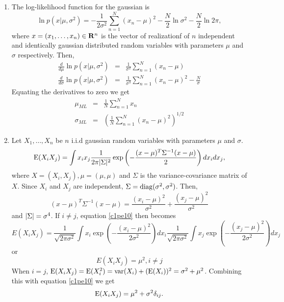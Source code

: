 \begin{enumerate}
\item The log-likelihood function for the gaussian is
\[
\ln p(x | \mu, \sigma^2) = -\frac{1}{2\sigma^2}\sum_{n=1}^N(x_n - \mu)^2 - \frac{N}{2}\ln\sigma^2 - \frac{N}{2}\ln 2\pi,
\]
where $x = (x_1, \ldots, x_n) \in \mathbf{R}^n$ is the vector of realizationf of $n$ independent and identically gaussian 
distributed random variables with parameters $\mu$ and $\sigma$ respectively. Then,
\begin{eqnarray*}
\frac{d}{d\mu}\ln p(x | \mu, \sigma^2) &=& \frac{1}{\sigma^2}\sum_{n=1}^N (x_n - \mu) \\
\frac{d}{d\sigma}\ln p(x | \mu, \sigma^2) &=& \frac{1}{\sigma^3}\sum_{n=1}^N (x_n - \mu)^2 - \frac{N}{\sigma} 
\end{eqnarray*}
Equating the derivatives to zero we get
\begin{eqnarray*}
\mu_{ML} &=& \frac{1}{N}\sum_{n=1}^N x_n \\
\sigma_{ML} &=& \left(\frac{1}{N}\sum_{n=1}^N(x_n - \mu)^2\right)^{1/2}
\end{eqnarray*}

\item Let $X_1, \ldots, X_n$ be $n$ i.i.d gaussian random variables with parameters $\mu$ and $\sigma$.
\begin{equation}\label{c1pe10}
\operatorname{E}(X_i X_j) = \int x_i x_j \frac{1}{2\pi\lvert\Sigma\rvert^2}\exp\left(-\frac{(x - \mu)^T\Sigma^{-1}(x - \mu)}{2}\right)dx_i dx_j,
\end{equation}
where $X = (X_i, X_j), \mu = (\mu, \mu)$ and $\Sigma$ is the variance-covariance matrix
of $X$. Since $X_i$ and $X_j$ are independent, $\Sigma = \operatorname{diag}(\sigma^2, \sigma^2)$. Then,
\[
(x - \mu)^T\Sigma^{-1}(x - \mu) = \frac{(x_i - \mu)^2}{\sigma^2} + \frac{(x_j - \mu)^2}{\sigma^2}
\]
and $\lvert\Sigma\rvert = \sigma^4$. If $i \ne j$, equation \eqref{c1pe10} then becomes
\[
E(X_iX_j) = \frac{1}{\sqrt{2\pi\sigma^2}}\int x_i \exp\left(-\frac{(x_i - \mu)^2}{2\sigma^2}\right)dx_i
            \frac{1}{\sqrt{2\pi\sigma^2}}\int x_j \exp\left(-\frac{(x_j - \mu)^2}{2\sigma^2}\right)dx_j
\]
or
\begin{equation}\label{c1pe11}
E(X_iX_j) = \mu^2, i \ne j
\end{equation}
When $i = j$, $\operatorname{E}(X_iX_j) = \operatorname{E}(X_i^2) = \operatorname{var}(X_i) + (\operatorname{E}(X_i))^2 = \sigma^2 + \mu^2$. Combining
this with equation \eqref{c1pe10} we get
\[
\operatorname{E}(X_iX_j) = \mu^2 + \sigma^2\delta_{ij}.
\]
\end{enumerate}
